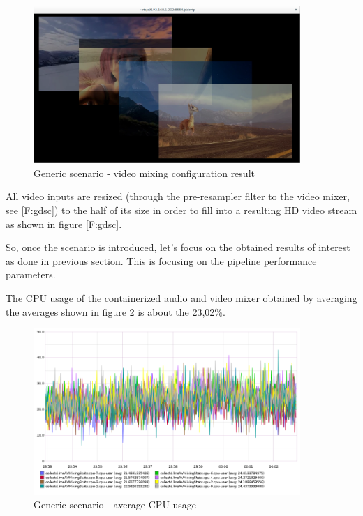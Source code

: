 \begin{figure}[!htb]
\begin{center}
\includegraphics[width=0.90\textwidth]{./images/outAVmix.png}
\caption{Generic scenario - video mixing configuration result}
\label{F:outVMix}
\end{center}
\end{figure}

All video inputs are resized (through the pre-resampler filter to the video mixer, see \ref{F:gdsc}) to the half of its size in order to fill into a resulting HD video stream as shown in figure \ref{F:gdsc}.

So, once the scenario is introduced, let's focus on the obtained results of interest as done in previous section. This is focusing on the pipeline performance parameters.

The CPU usage of the containerized audio and video mixer obtained by averaging the averages shown in figure \ref{F:gsavgcpu} is about the 23,02\%.

\begin{figure}[!htb]
\begin{center}
\includegraphics[width=0.90\textwidth]{./images/testAVMix/AVMixCPU.png}
\caption{Generic scenario - average CPU usage}
\label{F:gsavgcpu}
\end{center}
\end{figure}

